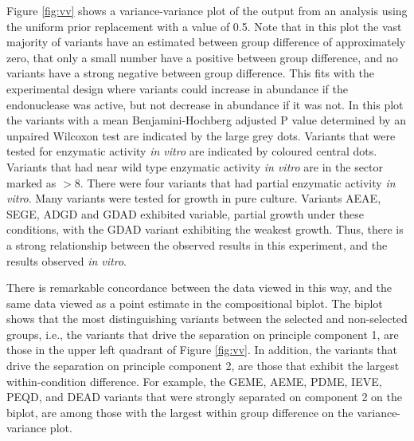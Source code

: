 \documentclass[article]{ajs}\usepackage[]{graphicx}\usepackage[]{color}
\begin{document}
Figure \ref{fig:vv} shows a variance-variance plot of the output from  an analysis using the uniform prior replacement with a value of 0.5. Note that in this plot the vast majority of variants have an estimated between group difference of approximately zero, that only a small number have a positive between group difference, and no variants have a strong negative between group difference. This fits with the experimental design where variants could increase in abundance if the endonuclease was active, but not decrease in abundance if it was not. In this plot the variants with a mean Benjamini-Hochberg adjusted P value determined by an unpaired Wilcoxon test are indicated by the large grey dots. Variants that were tested for enzymatic activity \emph{in vitro} are indicated by coloured central dots. Variants that had near wild type enzymatic activity \emph{in vitro} are in the sector marked as $>8$. There were four variants that had partial enzymatic activity \emph{in vitro}. Many variants were tested for growth in pure culture. Variants AEAE, SEGE, ADGD and GDAD exhibited variable, partial growth under these conditions, with the GDAD variant exhibiting the weakest growth. Thus, there is a strong relationship between the observed results in this experiment, and the results observed \emph{in vitro}.


There is remarkable concordance between the data viewed in this way, and the same data viewed as a point estimate in the compositional biplot. The biplot shows that the most distinguishing variants between the selected and non-selected groups, i.e., the variants that drive the separation on principle component 1, are those in the upper left quadrant of Figure \ref{fig:vv}. In addition, the variants that drive the separation on principle component 2, are those that exhibit the largest within-condition difference. For example, the GEME, AEME, PDME, IEVE, PEQD, and DEAD variants that were strongly separated on component 2 on the biplot, are among those with the largest within group difference on the variance-variance plot.
\end{document}
